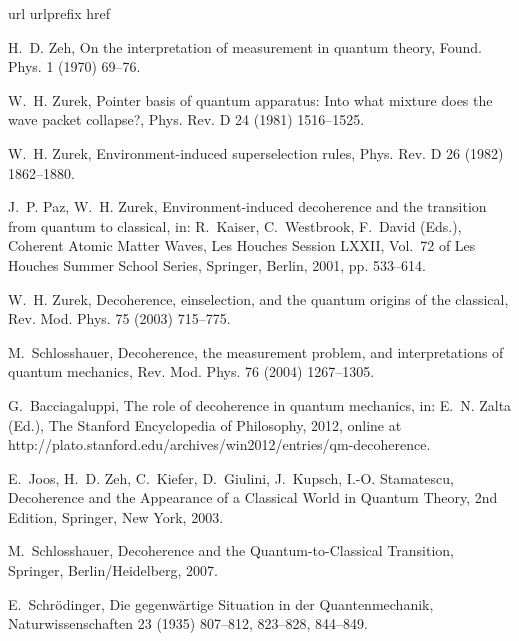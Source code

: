 \documentclass[3p,sort&compress,12pt]{elsarticle}
\begin{document}
% 

\begin{thebibliography}{100}
\expandafter\ifx\csname url\endcsname\relax
  \def\url#1{\texttt{#1}}\fi
\expandafter\ifx\csname urlprefix\endcsname\relax\def\urlprefix{URL }\fi
\expandafter\ifx\csname href\endcsname\relax
  \def\href#1#2{#2} \def\path#1{#1}\fi

H.~D. Zeh, On the interpretation of measurement in quantum theory, Found. Phys.
  1 (1970) 69--76.

W.~H. Zurek, Pointer basis of quantum apparatus: {I}nto what mixture does the
  wave packet collapse?, Phys. Rev. D 24 (1981) 1516--1525.

W.~H. Zurek, Environment-induced superselection rules, Phys. Rev. D 26 (1982)
  1862--1880.

J.~P. Paz, W.~H. Zurek, Environment-induced decoherence and the transition from
  quantum to classical, in: R.~Kaiser, C.~Westbrook, F.~David (Eds.), Coherent
  Atomic Matter Waves, Les Houches Session LXXII, Vol.~72 of Les Houches Summer
  School Series, Springer, Berlin, 2001, pp. 533--614.

W.~H. Zurek, Decoherence, einselection, and the quantum origins of the
  classical, Rev. Mod. Phys. 75 (2003) 715--775.

M.~Schlosshauer, Decoherence, the measurement problem, and interpretations of
  quantum mechanics, Rev. Mod. Phys. 76 (2004) 1267--1305.

G.~Bacciagaluppi, The role of decoherence in quantum mechanics, in: E.~N. Zalta
  (Ed.), The Stanford Encyclopedia of Philosophy, 2012, online at \href{http://plato.stanford.edu/archives/win2012/entries/qm-decoherence}{\path{http://plato.stanford.edu/archives/win2012/entries/qm-decoherence}}.

E.~Joos, H.~D. Zeh, C.~Kiefer, D.~Giulini, J.~Kupsch, I.-O. Stamatescu,
  Decoherence and the Appearance of a Classical World in Quantum Theory, 2nd
  Edition, Springer, New York, 2003.

M.~Schlosshauer, Decoherence and the Quantum-to-Classical Transition, Springer,
  Berlin/Heidelberg, 2007.

E.~Schr{\"o}dinger, Die gegenw{\"a}rtige {S}ituation in der {Q}uantenmechanik,
  Naturwissenschaften 23 (1935) 807--812, 823--828, 844--849.


\end{thebibliography}
\end{document}
